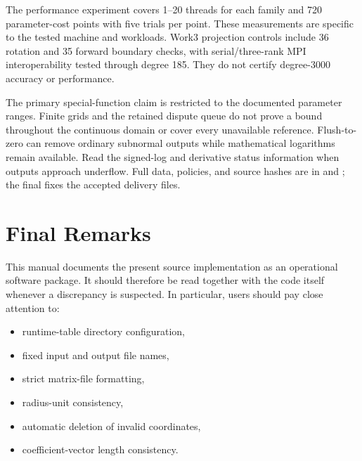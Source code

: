 \documentclass[11pt,a4paper]{article}
\begin{document}
The performance experiment covers 1--20 threads for each family and
720 parameter-cost points with five trials per point. These measurements
are specific to the tested machine and workloads. Work3 projection
controls include 36 rotation and 35 forward boundary checks, with
serial/three-rank MPI interoperability tested through degree 185.
They do not certify degree-3000 accuracy or performance.

The primary special-function claim is restricted to the documented
parameter ranges. Finite grids and the retained dispute queue do not
prove a bound throughout the continuous domain or cover every unavailable
reference. Flush-to-zero can remove ordinary subnormal outputs while
mathematical logarithms remain available. Read the signed-log and derivative
status information when outputs approach underflow. Full data, policies,
and source hashes are in  and
; the final 
fixes the accepted delivery files.

\section{Final Remarks}

This manual documents the present source implementation as an operational software package. It should therefore be read together with the code itself whenever a discrepancy is suspected. In particular, users should pay close attention to:
\begin{itemize}
  \item runtime-table directory configuration,
  \item fixed input and output file names,
  \item strict matrix-file formatting,
  \item radius-unit consistency,
  \item automatic deletion of invalid coordinates,
  \item coefficient-vector length consistency.
\end{itemize}
\end{document}
